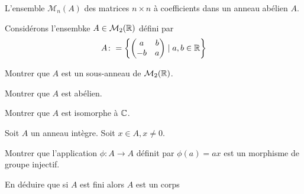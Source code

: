 \documentclass{report}
\begin{document}
\begin{exo}
    L'ensemble \(\mathcal{M}_n(A)\) des matrices \(n\times n\) à coefficients dans un anneau abélien \(A\).
\end{exo}

\begin{exo}
    Considérons l'ensembke \(A\in\mathcal{M}_2(\mathbb{R})\) défini par
    \[ A\colon=\left\{ \begin{pmatrix} a&b\\-b&a \end{pmatrix}\mid a,b\in\mathbb{R}\right\}\]
    \begin{q}{1}
        Montrer que \(A\) est un sous-anneau de \(\mathcal{M}_2(\mathbb{R})\).
    \end{q}
    \begin{q}{2}
        Montrer que \(A\) est abélien.
    \end{q}
    \begin{q}{3}
        Montrer que \(A\) est isomorphe à \(\mathbb{C}\).
    \end{q}
\end{exo}

\begin{exo}
    Soit \(A\) un anneau intègre. Soit \(x\in A, x\neq 0\).
    \begin{q}{1}
        Montrer que l'application \(\phi\colon A\to A\) définit par \(\phi(a)=ax\)
        est un morphisme de groupe injectif.
    \end{q}
    \begin{q}{2}
        En déduire que si \(A\) est fini alors \(A\) est un corps
    \end{q}
\end{exo}
\end{document}

